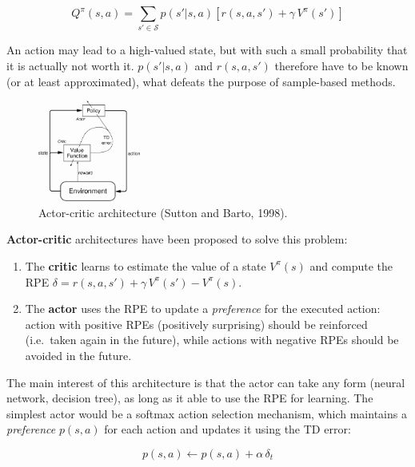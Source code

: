 \documentclass[
  letterpaper,
  DIV=11,
  numbers=noendperiod]{scrreprt}
\providecommand{\tightlist}{%
  \setlength{\itemsep}{0pt}\setlength{\parskip}{0pt}}\usepackage{longtable,booktabs,array}
\begin{document}
\[
    Q^{\pi}(s, a) = \sum_{s' \in \mathcal{S}} p(s'|s, a) [r(s, a, s') + \gamma \, V^\pi(s')]
\]

An action may lead to a high-valued state, but with such a small
probability that it is actually not worth it. \(p(s'|s, a)\) and
\(r(s, a, s')\) therefore have to be known (or at least approximated),
what defeats the purpose of sample-based methods.

\begin{figure}

{\centering \includegraphics[width=0.3\textwidth,height=\textheight]{./img/actorcritic.png}

}

\caption{\label{fig-actorcritic}Actor-critic architecture (Sutton and
Barto, 1998).}

\end{figure}

\textbf{Actor-critic} architectures have been proposed to solve this
problem:

\begin{enumerate}
\def\labelenumi{\arabic{enumi}.}
\tightlist
\item
  The \textbf{critic} learns to estimate the value of a state
  \(V^\pi(s)\) and compute the RPE
  \(\delta = r(s, a, s') + \gamma \, V^\pi(s') - V^\pi(s)\).
\item
  The \textbf{actor} uses the RPE to update a \emph{preference} for the
  executed action: action with positive RPEs (positively surprising)
  should be reinforced (i.e.~taken again in the future), while actions
  with negative RPEs should be avoided in the future.
\end{enumerate}

The main interest of this architecture is that the actor can take any
form (neural network, decision tree), as long as it able to use the RPE
for learning. The simplest actor would be a softmax action selection
mechanism, which maintains a \emph{preference} \(p(s, a)\) for each
action and updates it using the TD error:

\[
    p(s, a) \leftarrow p(s, a) + \alpha \, \delta_t
\]
\end{document}
